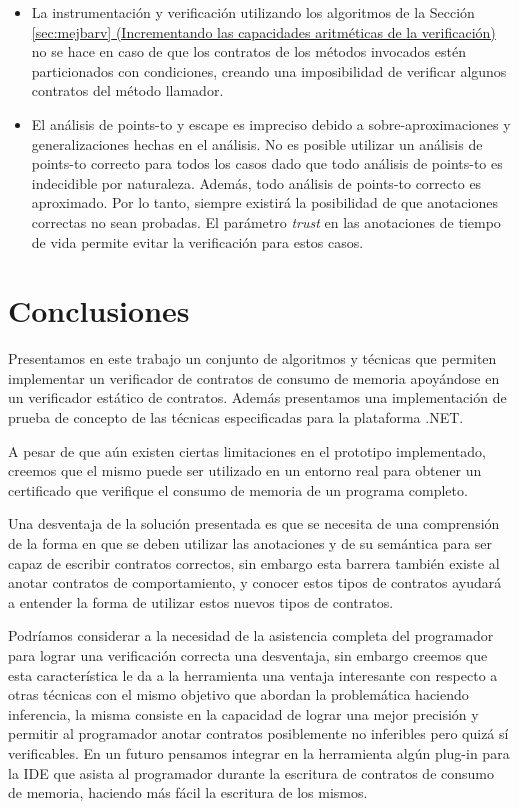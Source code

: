 \documentclass[12pt,a4paper]{article}
\begin{document}
			\begin{itemize}
				\item La instrumentación y verificación utilizando los algoritmos de la Sección \hyperref[sec:mejbarv]{\ref*{sec:mejbarv} (Incrementando las capacidades aritméticas de la verificación)} no se hace en caso de que los contratos de los métodos invocados estén particionados con condiciones, creando una imposibilidad de verificar algunos contratos del método llamador.
				\item El análisis de points-to y escape es impreciso debido a sobre-aproximaciones y generalizaciones hechas en el análisis. No es posible utilizar un análisis de points-to correcto para todos los casos dado que todo análisis de points-to es indecidible por naturaleza. Además, todo análisis de points-to correcto es aproximado. Por lo tanto, siempre existirá la posibilidad de que anotaciones correctas no sean probadas. El parámetro \textit{trust} en las anotaciones de tiempo de vida permite evitar la verificación para estos casos.
			\end{itemize}
	\newpage
	\section{Conclusiones} \label{sec:concl}
		Presentamos en este trabajo un conjunto de algoritmos y técnicas que permiten implementar un verificador de contratos de consumo de memoria apoyándose en un verificador estático de contratos. Además presentamos una implementación de prueba de concepto de las técnicas especificadas para la plataforma .NET.

		A pesar de que aún existen ciertas limitaciones en el prototipo implementado, creemos que el mismo puede ser utilizado en un entorno real para obtener un certificado que verifique el consumo de memoria de un programa completo.

		Una desventaja de la solución presentada es que se necesita de una comprensión de la forma en que se deben utilizar las anotaciones y de su semántica para ser capaz de escribir contratos correctos, sin embargo esta barrera también existe al anotar contratos de comportamiento, y conocer estos tipos de contratos ayudará a entender la forma de utilizar estos nuevos tipos de contratos.

		Podríamos considerar a la necesidad de la asistencia completa del programador para lograr una verificación correcta una desventaja, sin embargo creemos que esta característica le da a la herramienta una ventaja interesante con respecto a otras técnicas con el mismo objetivo que abordan la problemática haciendo inferencia, la misma consiste en la capacidad de lograr una mejor precisión y permitir al programador anotar contratos posiblemente no inferibles pero quizá sí verificables. En un futuro pensamos integrar en la herramienta algún plug-in para la IDE que asista al programador durante la escritura de contratos de consumo de memoria, haciendo más fácil la escritura de los mismos.
\end{document}
